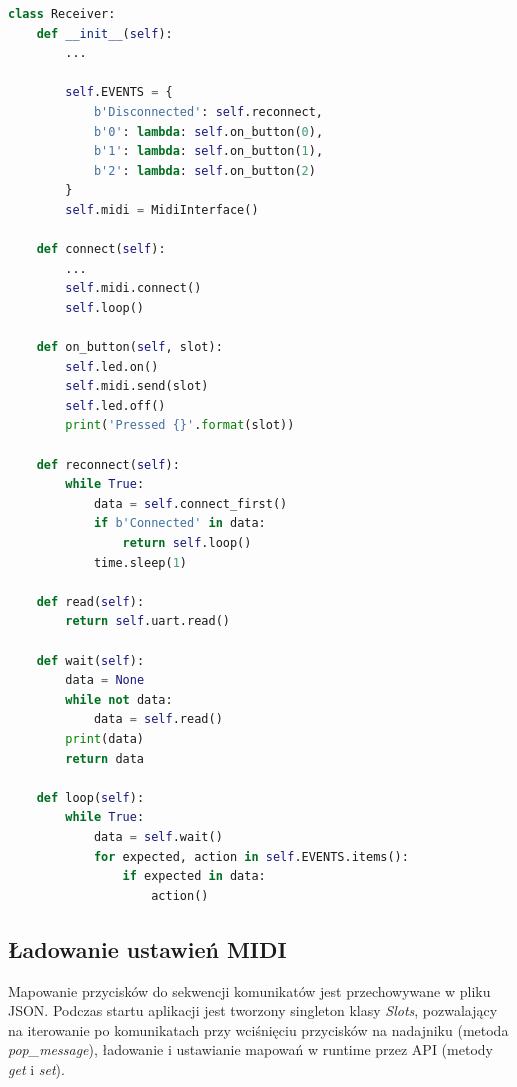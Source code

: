 \documentclass[eng,printmode]{mgr}
\begin{document}
\newpage
\begin{lstlisting}[language=Python]
class Receiver:
    def __init__(self):
    	...

        self.EVENTS = {
            b'Disconnected': self.reconnect,
            b'0': lambda: self.on_button(0),
            b'1': lambda: self.on_button(1),
            b'2': lambda: self.on_button(2)
        }
        self.midi = MidiInterface()

    def connect(self):
        ...
        self.midi.connect()
        self.loop()

    def on_button(self, slot):
        self.led.on()
        self.midi.send(slot)
        self.led.off()
        print('Pressed {}'.format(slot))

    def reconnect(self):
        while True:
            data = self.connect_first()
            if b'Connected' in data:
                return self.loop()
            time.sleep(1)

    def read(self):
        return self.uart.read()

    def wait(self):
        data = None
        while not data:
            data = self.read()
        print(data)
        return data

    def loop(self):
        while True:
            data = self.wait()
            for expected, action in self.EVENTS.items():
                if expected in data:
                    action()
\end{lstlisting}



\subsection{Ładowanie ustawień MIDI}
Mapowanie przycisków do sekwencji komunikatów jest przechowywane w pliku JSON.
Podczas startu aplikacji jest tworzony singleton klasy \textit{Slots}, pozwalający na iterowanie po komunikatach przy wciśnięciu przycisków na nadajniku (metoda \textit{pop\_message}), ładowanie i ustawianie mapowań w runtime przez API (metody \textit{get} i \textit{set}).
\end{document}
